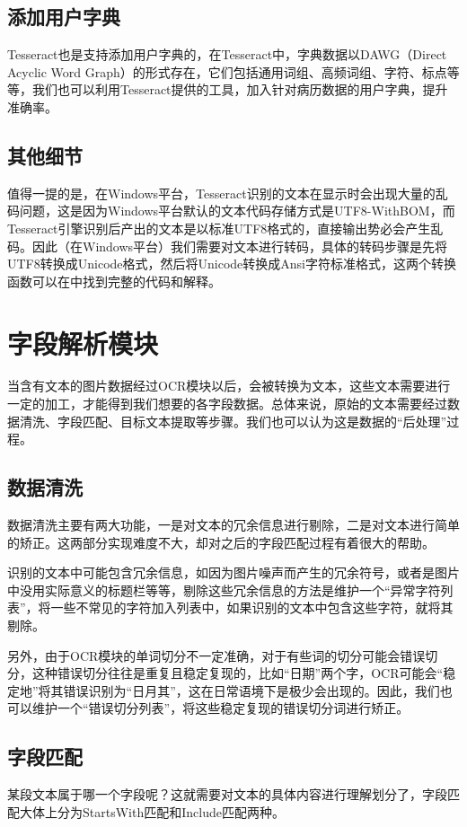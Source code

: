 \subsection{添加用户字典}
Tesseract也是支持添加用户字典的，在Tesseract中，字典数据以DAWG（Direct Acyclic Word Graph）的形式存在，它们包括通用词组、高频词组、字符、标点等等，我们也可以利用Tesseract提供的工具，加入针对病历数据的用户字典，提升准确率。

\subsection{其他细节}
值得一提的是，在Windows平台，Tesseract识别的文本在显示时会出现大量的乱码问题，这是因为Windows平台默认的文本代码存储方式是UTF8-WithBOM，而Tesseract引擎识别后产出的文本是以标准UTF8格式的，直接输出势必会产生乱码。因此（在Windows平台）我们需要对文本进行转码，具体的转码步骤是先将UTF8转换成Unicode格式，然后将Unicode转换成Ansi字符标准格式，这两个转换函数可以在\citep{character-encoding}中找到完整的代码和解释。

\section{字段解析模块}  %
当含有文本的图片数据经过OCR模块以后，会被转换为文本，这些文本需要进行一定的加工，才能得到我们想要的各字段数据。总体来说，原始的文本需要经过数据清洗、字段匹配、目标文本提取等步骤。我们也可以认为这是数据的“后处理”过程。

\subsection{数据清洗}
数据清洗主要有两大功能，一是对文本的冗余信息进行剔除，二是对文本进行简单的矫正。这两部分实现难度不大，却对之后的字段匹配过程有着很大的帮助。

识别的文本中可能包含冗余信息，如因为图片噪声而产生的冗余符号，或者是图片中没用实际意义的标题栏等等，剔除这些冗余信息的方法是维护一个“异常字符列表”，将一些不常见的字符加入列表中，如果识别的文本中包含这些字符，就将其剔除。

另外，由于OCR模块的单词切分不一定准确，对于有些词的切分可能会错误切分，这种错误切分往往是重复且稳定复现的，比如“日期”两个字，OCR可能会“稳定地”将其错误识别为“日月其”，这在日常语境下是极少会出现的。因此，我们也可以维护一个“错误切分列表”，将这些稳定复现的错误切分词进行矫正。

\subsection{字段匹配}
某段文本属于哪一个字段呢？这就需要对文本的具体内容进行理解划分了，字段匹配大体上分为StartsWith匹配和Include匹配两种。
